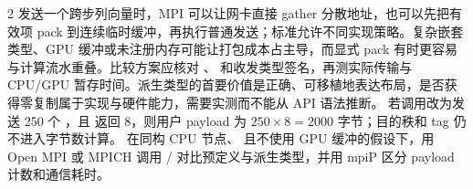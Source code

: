 \begin{solutionexercise}{2}
发送一个跨步列向量时，MPI 可以让网卡直接 gather 分散地址，也可以先把有效项 pack 到连续临时缓冲，再执行普通发送；标准允许不同实现策略。复杂嵌套类型、GPU 缓冲或未注册内存可能让打包成本占主导，而显式 pack 有时更容易与计算流水重叠。比较方案应核对 、 和收发类型签名，再测实际传输与 CPU/GPU 暂存时间。派生类型的首要价值是正确、可移植地表达布局，是否获得零复制属于实现与硬件能力，需要实测而不能从 API 语法推断。
\variantheading 若调用改为发送 250 个 ，且  返回 8，则用户 payload 为 $250\times8=2000$ 字节；目的秩和 tag 仍不进入字节数计算。
\practiceheading 在同构 CPU 节点、 且不使用 GPU 缓冲的假设下，用 Open MPI 或 MPICH 调用 / 对比预定义与派生类型，并用 mpiP 区分 payload 计数和通信耗时。
\end{solutionexercise}

